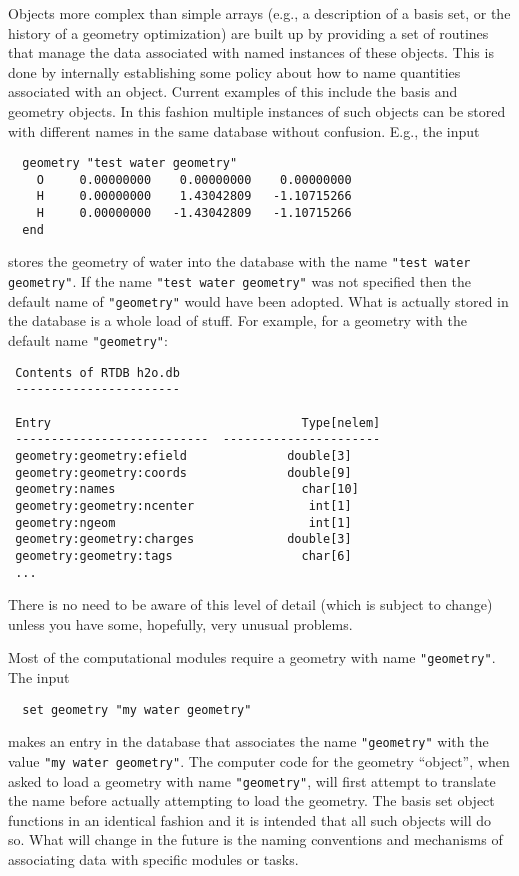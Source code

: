Objects more complex than simple arrays (e.g., a description of a
basis set, or the history of a geometry optimization) are built up by
providing a set of routines that manage the data associated with named
instances of these objects.  This is done by internally establishing
some policy about how to name quantities associated with an object.
Current examples of this include the basis and geometry objects.  In
this fashion multiple instances of such objects can be stored with
different names in the same database without confusion.  E.g., the
input
\begin{verbatim}
  geometry "test water geometry"
    O     0.00000000    0.00000000    0.00000000
    H     0.00000000    1.43042809   -1.10715266
    H     0.00000000   -1.43042809   -1.10715266
  end
\end{verbatim}
stores the geometry of water into the database with the name 
\verb+"test water geometry"+.  If the name \verb+"test water geometry"+
was not specified then the default name of \verb+"geometry"+ would
have been adopted.  What is actually stored in the database is a whole
load of stuff.  For example, for a geometry with the default name
\verb+"geometry"+:
\begin{verbatim}
 Contents of RTDB h2o.db
 -----------------------

 Entry                                   Type[nelem]
 ---------------------------  ----------------------
 geometry:geometry:efield              double[3]    
 geometry:geometry:coords              double[9]    
 geometry:names                          char[10]   
 geometry:geometry:ncenter                int[1]    
 geometry:ngeom                           int[1]    
 geometry:geometry:charges             double[3]    
 geometry:geometry:tags                  char[6]
 ...
\end{verbatim}
There is no need to be aware of this level of detail (which is subject
to change) unless you have some, hopefully, very unusual problems.

\sloppy

Most of the computational modules require a geometry with name
\verb+"geometry"+.  The input
\begin{verbatim}
  set geometry "my water geometry"
\end{verbatim}
makes an entry in the database that associates the name
\verb+"geometry"+ with the value \verb+"my water geometry"+.  The
computer code for the geometry ``object'', when asked to load a geometry
with name \verb+"geometry"+, will first attempt to translate the name
before actually attempting to load the geometry.  The basis set object
functions in an identical fashion and it is intended that all such
objects will do so.  What will change in the future is the naming
conventions and mechanisms of associating data with specific modules
or tasks.


